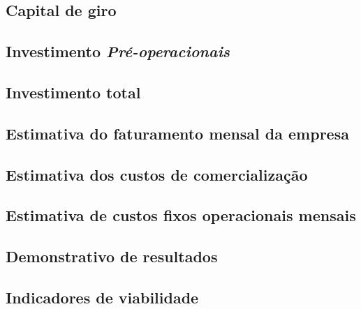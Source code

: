 \subsection{Capital de giro}

\subsection{Investimento \textit{Pré-operacionais}}

\subsection{Investimento total}

\subsection{Estimativa do faturamento mensal da empresa}

\subsection{Estimativa dos custos de comercialização}

\subsection{Estimativa de custos fixos operacionais mensais}

\subsection{Demonstrativo de resultados}

\subsection{Indicadores de viabilidade}